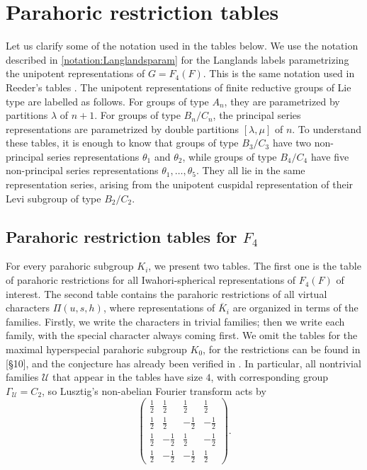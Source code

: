 \section{Parahoric restriction tables}
Let us clarify some of the notation used in the tables below. We use the notation described in \ref{notation:Langlandsparam} for the Langlands labels parametrizing the unipotent representations of $G=F_4(F)$. This is the same notation used in Reeder's tables \cite{Reeder2000}. The unipotent representations of finite reductive groups of Lie type are labelled as follows. For groups of type $A_n$, they are parametrized by partitions $\lambda$ of $n+1$. For groups of type $B_n/C_n$, the principal series representations are parametrized by double partitions $[\lambda,\mu]$ of $n$. To understand these tables, it is enough to know that groups of type $B_3/C_3$ have two non-principal series representations $\theta_1$ and $\theta_2$, while groups of type $B_4/C_4$ have five non-principal series representations $\theta_1,\ldots,\theta_5$. They all lie in the same representation series, arising from the unipotent cuspidal representation of their Levi subgroup of type $B_2/C_2$.


\subsection{Parahoric restriction tables for \texorpdfstring{$F_4$}{PDFstring}}
For every parahoric subgroup $K_i$, we present two tables. The first one is the table of parahoric restrictions for all Iwahori-spherical representations of $F_4(F)$ of interest. The second table contains the parahoric restrictions of all virtual characters $\Pi(u,s,h)$, where representations of $\overline{K}_i$ are organized in terms of the families. Firstly, we write the characters in trivial families; then we write each family, with the special character always coming first. We omit the tables for the maximal hyperspecial parahoric subgroup $K_0$, for the restrictions can be found in \cite{Reeder2000}[\S 10], and the conjecture has already been verified in \cite{Ciubotaru2020}. In particular, all nontrivial families $\mathcal{U}$ that appear in the tables have size $4$, with corresponding group $\Gamma_\mathcal{U}=C_2$, so Lusztig's non-abelian Fourier transform acts by 
$$\begin{pmatrix}
    \frac{1}{2} & \frac{1}{2} & \frac{1}{2} & \frac{1}{2} \\
    \frac{1}{2} & \frac{1}{2} & -\frac{1}{2} & -\frac{1}{2} \\
    \frac{1}{2} & -\frac{1}{2} & \frac{1}{2} & -\frac{1}{2} \\
    \frac{1}{2} & -\frac{1}{2} & -\frac{1}{2} & \frac{1}{2} 
\end{pmatrix}.$$

